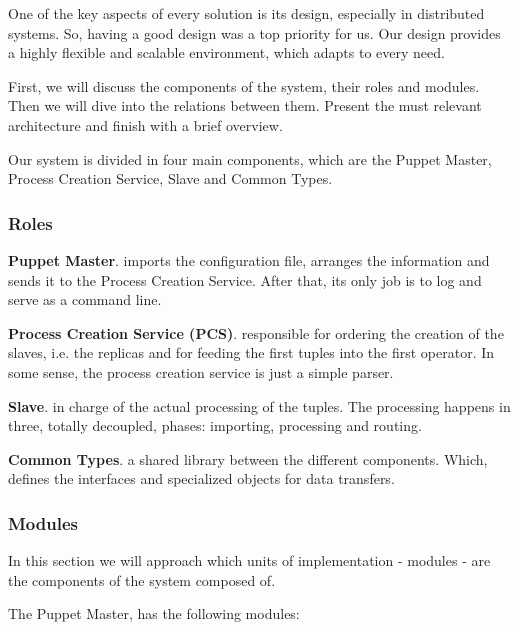 \documentclass[times, 10pt,twocolumn]{article}
\begin{document}

One of the key aspects of every solution is its design, especially in distributed systems. So, having a good design was a top priority for us. Our design provides a highly flexible and scalable environment, which adapts to every need.

First, we will discuss the components of the system, their roles and modules. Then we will dive into the relations between them. Present the must relevant architecture and finish with a brief overview.


Our system is divided in four main components, which are the Puppet Master, Process Creation Service, Slave and Common Types.

\subsubsection{Roles}

\textbf{Puppet Master}. imports the configuration file, arranges the information and sends it to the Process Creation Service. After that, its only job is to log and serve as a command line.

\textbf{Process Creation Service (PCS)}. responsible for ordering the creation of the slaves, i.e. the replicas and for feeding the first tuples into the first operator. In some sense, the process creation service is just a simple parser.

\textbf{Slave}. in charge of the actual processing of the tuples. The processing happens in three, totally decoupled, phases: importing, processing and routing. 

\textbf{Common Types}. a shared library between the different components. Which, defines the interfaces and specialized objects for data transfers.



\subsubsection{Modules}

In this section we will approach which units of implementation - modules - are the components of the system composed of.

The Puppet Master, has the following modules: 
\end{document}
